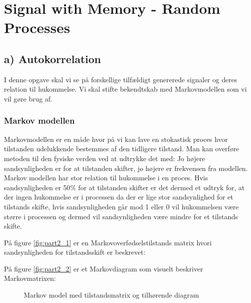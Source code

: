 \chapter{Signal with Memory - Random Processes}
\label{ch:part2}

\section{ a) Autokorrelation}
I denne opgave skal vi se på forskellige tilfældigt genererede signaler og deres relation til hukommelse. Vi skal stifte bekendtskab med Markovmodellen som vi vil gøre brug af.\\
\subsection{Markov modellen}
Markovmodellen er en måde hvor på vi kan lave en stokastisk proces hvor tilstanden udelukkende bestemmes af den tidligere tilstand. Man kan overføre metoden til den fysiske verden ved at udtrykke det med: Jo højere sandsynligheden er for at tilstanden skifter, jo højere er frekvensen fra modellen. Markov modellen har stor relation til hukommelse i en proces. Hvis sandsynligheden er 50$\%$ for at tilstanden skifter er det dermed et udtryk for, at der ingen hukommelse er i processen da der er lige stor sandsynlighed for et tilstands skifte, hvis sandsynligheden går mod 1 eller 0 vil hukommelsen være større i processen og dermed vil sandsynligheden være mindre for et tilstands skifte.

 På figure \ref{fig:part2_1} er en Markovoverfødselstilstands matrix hvori sandsynligheden for tilstandsskift er beskrevet:  

På figure \ref{fig:part2_2} er et Markovdiagram som visuelt beskriver Markovmatrixen:

 \begin{figure}[!h]
	\centering
	\caption{Markov model med tilstandsmatrix og tilhørende diagram}
	\label{fig:part2_markov}
\end{figure}
 

